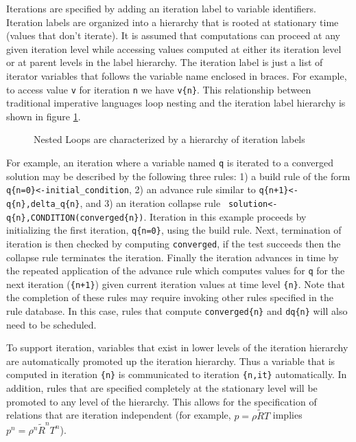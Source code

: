 \documentclass[10pt,epsf]{book}
\begin{document}
Iterations are specified by adding an iteration label to variable
identifiers.  Iteration labels are organized into a hierarchy that is
rooted at stationary time (values that don't iterate).  It is assumed
that computations can proceed at any given iteration level while
accessing values computed at either its iteration level or at parent
levels in the label hierarchy.  The iteration label is just a list of
iterator variables that follows the variable name enclosed in braces.
For example, to access value {\tt v} for iteration {\tt n} we have 
{\tt v\{n\}}.  This relationship between traditional imperative languages
loop nesting and the iteration label hierarchy is shown in figure
\ref{fig:nested}. 

\begin{figure}[h]
\centerline{
\epsfxsize=3.4in
}
\caption{Nested Loops are characterized by a hierarchy of iteration labels}
\label{fig:nested}
\end{figure}

For example, an iteration where a variable named {\tt q} is iterated
to a converged solution may be described by the following three rules:
1) a build rule of the form {\tt q\{n=0\}<-initial\_condition}, 2) an
advance rule similar to {\tt q\{n+1\}<-q\{n\},delta\_q\{n\}}, and 3)
an iteration collapse rule {\tt
  solution<-q\{n\},CONDITION(converged\{n\})}.  Iteration in this
example proceeds by initializing the first iteration, {\tt q\{n=0\}},
using the build rule.  Next, termination of iteration is then checked
by computing {\tt converged}, if the test succeeds then the collapse
rule terminates the iteration.  Finally the iteration advances in time
by the repeated application of the advance rule which computes values
for {\tt q} for the next iteration ({\tt\{n+1\}}) given current
iteration values at time level {\tt\{n\}}.  Note that the completion
of these rules may require invoking other rules specified in the rule
database.  In this case, rules that compute {\tt converged\{n\}} and
{\tt dq\{n\}} will also need to be scheduled.

To support iteration, variables that exist in lower levels of the
iteration hierarchy are automatically promoted up the iteration
hierarchy.  Thus a variable that is computed in iteration {\tt\{n\}}
is communicated to iteration {\tt\{n,it\}} automatically.  In
addition, rules that are specified completely at the stationary level
will be promoted to any level of the hierarchy.  This allows for the
specification of relations that are iteration independent (for
example, $p = \rho \tilde{R} T$ implies $p^n = \rho^n \tilde{R}^n
T^n$).
\end{document}
